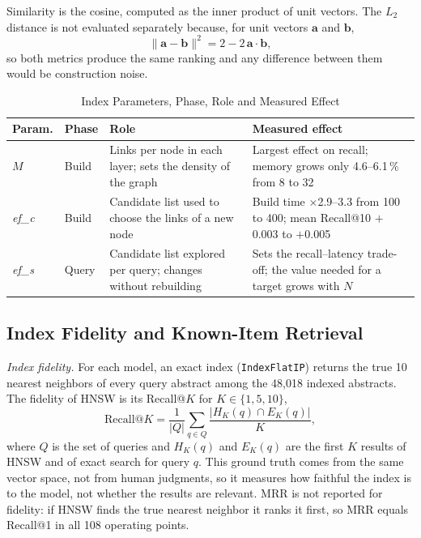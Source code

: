 \documentclass[conference, letterpaper]{IEEEtran}
\begin{document}
Similarity is the cosine, computed as the inner product of unit vectors. The $L_2$ distance is not evaluated separately because, for unit vectors $\mathbf{a}$ and $\mathbf{b}$,
\begin{equation}
\lVert \mathbf{a}-\mathbf{b} \rVert^2 = 2 - 2\,\mathbf{a}\cdot\mathbf{b},
\label{eq:l2}
\end{equation}
so both metrics produce the same ranking and any difference between them would be construction noise.

\begin{table}[!tb]
\centering
\caption{Index Parameters, Phase, Role and Measured Effect}
\label{tab:params}
\footnotesize
\setlength{\tabcolsep}{3pt}
\begin{tabular}{@{}l l >{\raggedright\arraybackslash}p{2.55cm} >{\raggedright\arraybackslash}p{2.75cm}@{}}
\toprule
\textbf{Param.} & \textbf{Phase} & \textbf{Role} & \textbf{Measured effect} \\
\midrule
$M$ & Build & Links per node in each layer; sets the density of the graph & Largest effect on recall; memory grows only 4.6--6.1\,\% from 8 to 32 \\
\addlinespace
\textit{ef\_c} & Build & Candidate list used to choose the links of a new node & Build time $\times$2.9--3.3 from 100 to 400; mean Recall@10 $+$0.003 to $+$0.005 \\
\addlinespace
\textit{ef\_s} & Query & Candidate list explored per query; changes without rebuilding & Sets the recall--latency trade-off; the value needed for a target grows with $N$ \\
\bottomrule
\end{tabular}
\end{table}

\subsection{Index Fidelity and Known-Item Retrieval}

\textit{Index fidelity.} For each model, an exact index (\texttt{IndexFlatIP}) returns the true 10 nearest neighbors of every query abstract among the 48,018 indexed abstracts. The fidelity of HNSW is its Recall@$K$ for $K \in \{1,5,10\}$,
\begin{equation}
\mathrm{Recall@}K = \frac{1}{|Q|}\sum_{q \in Q} \frac{|H_K(q) \cap E_K(q)|}{K},
\label{eq:recall}
\end{equation}
where $Q$ is the set of queries and $H_K(q)$ and $E_K(q)$ are the first $K$ results of HNSW and of exact search for query $q$. This ground truth comes from the same vector space, not from human judgments, so it measures how faithful the index is to the model, not whether the results are relevant. MRR is not reported for fidelity: if HNSW finds the true nearest neighbor it ranks it first, so MRR equals Recall@1 in all 108 operating points.
\end{document}
